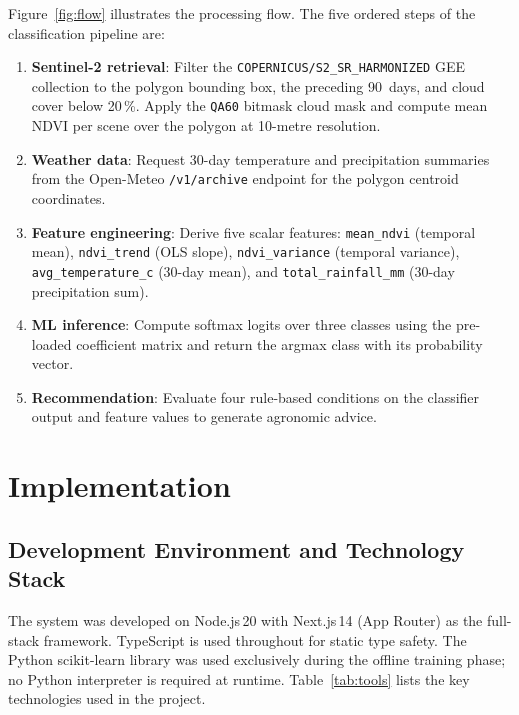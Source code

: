 \documentclass[conference]{IEEEtran}
\begin{document}
Figure~\ref{fig:flow} illustrates the processing flow.  The five ordered
steps of the classification pipeline are:

\begin{enumerate}
\item \textbf{Sentinel-2 retrieval}: Filter the
  \texttt{COPERNICUS/S2\_SR\_HARMONIZED} GEE collection to the polygon
  bounding box, the preceding 90~days, and cloud cover below 20\,\%.
  Apply the \texttt{QA60} bitmask cloud mask and compute mean NDVI per
  scene over the polygon at 10-metre resolution.
\item \textbf{Weather data}: Request 30-day temperature and precipitation
  summaries from the Open-Meteo \texttt{/v1/archive} endpoint for the
  polygon centroid coordinates.
\item \textbf{Feature engineering}: Derive five scalar features:
  \texttt{mean\_ndvi} (temporal mean), \texttt{ndvi\_trend} (OLS slope),
  \texttt{ndvi\_variance} (temporal variance), \texttt{avg\_temperature\_c}
  (30-day mean), and \texttt{total\_rainfall\_mm} (30-day precipitation sum).
\item \textbf{ML inference}: Compute softmax logits over three classes
  using the pre-loaded coefficient matrix and return the argmax class
  with its probability vector.
\item \textbf{Recommendation}: Evaluate four rule-based conditions on the
  classifier output and feature values to generate agronomic advice.
\end{enumerate}

\section{Implementation}

\subsection{Development Environment and Technology Stack}

The system was developed on Node.js\,20 with Next.js\,14 (App Router) as
the full-stack framework. TypeScript is used throughout for static type
safety. The Python scikit-learn library was used exclusively during the
offline training phase; no Python interpreter is required at runtime.
Table~\ref{tab:tools} lists the key technologies used in the project.
\end{document}
